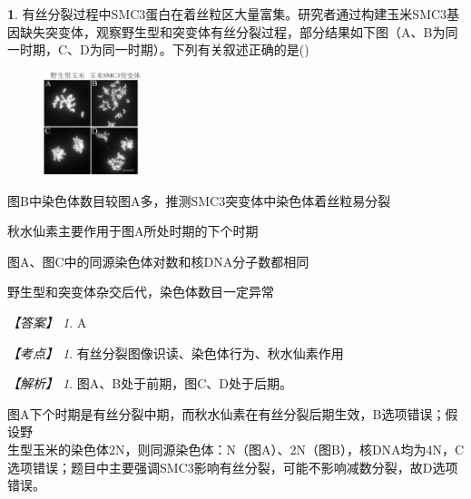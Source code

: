 \documentclass[UTF8, 10pt, a4paper, oneside]{ctexart}
\theoremstyle{definition}
\newtheorem{exercise}{}
\theoremstyle{remark}
\newtheorem*{answer}{【答案】}
\newtheorem*{point}{【考点】}      %
\newtheorem*{explanation}{【解析】}     %
\theoremstyle{plain}
\begin{document}
\begin{exercise}
有丝分裂过程中SMC3蛋白在着丝粒区大量富集。研究者通过构建玉米SMC3基因缺失突变体，观察野生型和突变体有丝分裂过程，部分结果如下图（A、B为同一时期，C、D为同一时期）。下列有关叙述正确的是\quad(\quad)
\begin{figure}[h!]
    \flushright
    \includegraphics[width=0.25\textwidth]{assists/8-1.jpg}
\end{figure}\vspace{-16em}
    \begin{adjustwidth}{2em}{}
            \begin{asparaenum}[A. ]
                \item 图B中染色体数目较图A多，推测SMC3突变体中染色体着丝粒易分裂
                \item 秋水仙素主要作用于图A所处时期的下个时期
                \item 图A、图C中的同源染色体对数和核DNA分子数都相同
                \item 野生型和突变体杂交后代，染色体数目一定异常
            \end{asparaenum}
    \end{adjustwidth}
    \begin{answer}
        A
    \end{answer}
    \begin{point}
        有丝分裂图像识读、染色体行为、秋水仙素作用
    \end{point}
    \begin{explanation}
        图A、B处于前期，图C、D处于后期。

        \noindent 图A下个时期是有丝分裂中期，而秋水仙素在有丝分裂后期生效，B选项错误；假设野\\生型玉米的染色体2N，则同源染色体：N（图A）、2N（图B），核DNA均为4N，C选项错误；题目中主要强调SMC3影响有丝分裂，可能不影响减数分裂，故D选项错误。
    \end{explanation}
\end{exercise}
\end{document}
